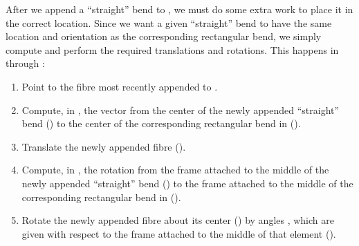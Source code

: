 %
After we append a ``straight'' bend to , we must do
some extra work to place it in the correct location. Since we
want a given ``straight'' bend to have the same location and
orientation as the corresponding rectangular bend, we simply
compute and perform the required translations and rotations.
This happens in  through :
\label{move.elem}
\begin{enumerate}
  \item Point  to the fibre most recently appended to
    .
  \item Compute, in , the vector 
    from the center of the newly appended ``straight'' bend
    ()%
    to the center of the corresponding
    rectangular bend in  ().
  \item Translate the newly appended fibre ().
  \item Compute, in , the rotation 
    from the frame attached to the middle of the newly appended
    ``straight'' bend () to the frame
    attached to the middle of the corresponding rectangular bend
    in  ().%
  \item Rotate the newly appended fibre about its center
    () by angles , which are given
    with respect to the frame attached to the middle of that
    element ().
\end{enumerate}

